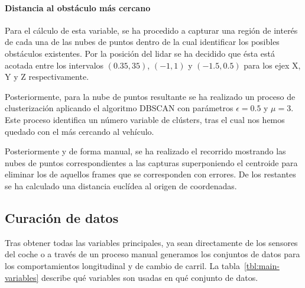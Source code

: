 \paragraph{Distancia al obstáculo más cercano}

Para el cálculo de esta variable, se ha procedido a capturar una región de interés de cada una de las nubes de puntos dentro de la cual identificar los posibles obstáculos existentes. Por la posición del lidar se ha decidido que ésta está acotada entre los intervalos $(0.35, 35)$, $(-1, 1)$ y $(-1.5, 0.5)$ para los ejex X, Y y Z respectivamente.

Posteriormente, para la nube de puntos resultante se ha realizado un proceso de clusterización aplicando el algoritmo DBSCAN con parámetros $\epsilon = 0.5$ y $\mu = 3$. Este proceso identifica un número variable de clústers, tras el cual nos hemos quedado con el más cercando al vehículo.

Posteriormente y de forma manual, se ha realizado el recorrido mostrando las nubes de puntos correspondientes a las capturas superponiendo el centroide para eliminar los de aquellos frames que se corresponden con errores. De los restantes se ha calculado una distancia euclídea al origen de coordenadas.

\subsection{Curación de datos}

Tras obtener todas las variables principales, ya sean directamente de los sensores del coche o a través de un proceso manual generamos los conjuntos de datos para los comportamientos longitudinal y de cambio de carril. La tabla~\ref{tbl:main-variables} describe qué variables son usadas en qué conjunto de datos.

